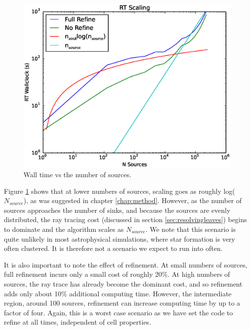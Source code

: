 \begin{figure}
\includegraphics[width=\textwidth]{graphics/timings.eps}
\caption[Wall time vs the number of sources.]{Wall time vs the number of sources.}
\label{fig:scaling}
\end{figure}

Figure \ref{fig:scaling} shows that at lower numbers of sources, scaling goes as roughly log($N_{source}$), as was suggested in chapter \ref{chap:method}. However, as the number of sources approaches the number of sinks, and because the sources are evenly distributed, the ray tracing cost (discussed in section \ref{sec:resolvingleaves}) begins to dominate and the algorithm scales as $N_{source}$. We note that this scenario is quite unlikely in most astrophysical simulations, where star formation is very often clustered. It is therefore not a scenario we expect to run into often.

It is also important to note the effect of refinement. At small numbers of sources, full refinement incurs only a small cost of roughly 20\%. At high numbers of sources, the ray trace has already become the dominant cost, and so refinement adds only about 10\% additional computing time. However, the intermediate region, around 100 sources, refinement can increase computing time by up to a factor of four. Again, this is a worst case scenario as we have set the code to refine at all times, independent of cell properties.


